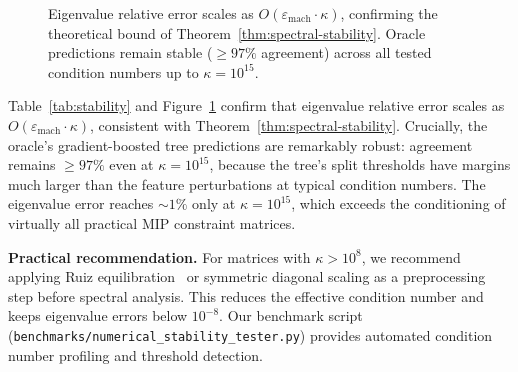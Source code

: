 \documentclass[11pt]{article}
\begin{document}
\begin{figure}[t]
\centering
{}
\caption{Eigenvalue relative error scales as $O(\varepsilon_{\mathrm{mach}} \cdot \kappa)$,
confirming the theoretical bound of Theorem~\ref{thm:spectral-stability}.
Oracle predictions remain stable ($\geq 97\%$ agreement) across all tested
condition numbers up to $\kappa = 10^{15}$.}
\label{fig:stability-curve}
\end{figure}

Table~\ref{tab:stability} and Figure~\ref{fig:stability-curve} confirm that
eigenvalue relative error scales as $O(\varepsilon_{\mathrm{mach}} \cdot \kappa)$,
consistent with Theorem~\ref{thm:spectral-stability}. Crucially, the oracle's
gradient-boosted tree predictions are remarkably robust: agreement remains
$\geq 97\%$ even at $\kappa = 10^{15}$, because the tree's split thresholds
have margins much larger than the feature perturbations at typical condition
numbers. The eigenvalue error reaches $\sim 1\%$ only at $\kappa = 10^{15}$,
which exceeds the conditioning of virtually all practical MIP constraint matrices.

\textbf{Practical recommendation.} For matrices with $\kappa > 10^{8}$, we
recommend applying Ruiz equilibration~\cite{ruiz2001} or symmetric diagonal
scaling as a preprocessing step before spectral analysis. This reduces the
effective condition number and keeps eigenvalue errors below $10^{-8}$. Our
benchmark script (\texttt{benchmarks/numerical\_stability\_tester.py}) provides
automated condition number profiling and threshold detection.
\end{document}
